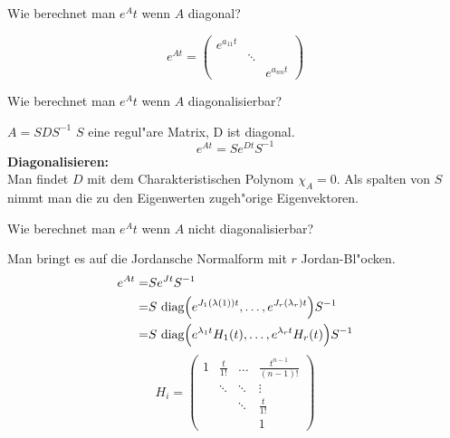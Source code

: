 \documentclass[9pt]{article}
\newenvironment{field}{}{\newpage}
\newif\ifnote
\newenvironment{note}{\notetrue}{\notefalse}
\newcommand{\localtag}{}
\newcommand{\globaltag}{}
\newcommand{\uuid}{}
\newcommand{\tags}[1]{
    \ifnote 
        \renewcommand{\localtag}{#1}
    \else
        \renewcommand{\globaltag}{#1}
    \fi 
    }
\newcommand{\xplain}[1]{\renewcommand{\uuid}{#1}}
\begin{document}
		\begin{note}
			\xplain{68dcdd7a-ec39-4c6e-ae29-65b19273592b}
			\tags{LDGLS, konstante-koeffizienten, 3.9.4}
			
			\begin{field}  %
				Wie berechnet man $e^At$ wenn $A$ diagonal?
			\end{field}
			
			\begin{field}  %
				\begin{equation*}
					e^{At} = 
						\begin{pmatrix}
					     e^{a_{11}t} & 		&			\\
					     			&\ddots &			 \\
					     			&		&e^{a_{nn}t}
						\end{pmatrix}
				\end{equation*}
			\end{field}
				
			\begin{field}  %
				Wie berechnet man $e^At$ wenn $A$ diagonalisierbar?
			\end{field}
			
			\begin{field}  %

				$A=SDS^{-1}$ $S$ eine regul"are Matrix, D ist diagonal. 
				\begin{equation*}
				e^{At} = Se^{Dt}S^{-1}
				\end{equation*}
				\textbf{Diagonalisieren:}\\
		
				Man findet $D$ mit dem Charakteristischen Polynom  $ \chi_A=0$. Als spalten von $S$ nimmt man die zu den Eigenwerten zugeh"orige Eigenvektoren.  	 
			\end{field}
				
			\begin{field}  %
					Wie berechnet man $e^At$ wenn $A$ nicht diagonalisierbar?
			\end{field}
			
			\begin{field}  %
				Man bringt es auf die Jordansche Normalform mit $r$ Jordan-Bl"ocken.
				\begin{align*}
					e^{At} =& Se^{Jt}S^{-1}\\
						   =& S \ \text{diag}\qty(e^{J_1(\lambda(1))t}, \dots, e^{J_r(\lambda_r)t}) S^{-1} \\
						   =&S \ \text{diag}\qty(e^{\lambda_1 t}H_1(t), \dots, e^{\lambda_r t}H_r(t)) S^{-1}
				\end{align*}
				\begin{equation*}
				H_i = 
					\begin{pmatrix}
						1 & \frac{t}{1!} & \dots  & \frac{t^{n-1}}{(n-1)!} \\
						  & \ddots       & \ddots & \vdots                 \\
						  &              & \ddots & \frac{t}{1!}           \\
						  &              &        & 1
					\end{pmatrix}	
				\end{equation*}
			\end{field}
		\end{note}
\end{document}
